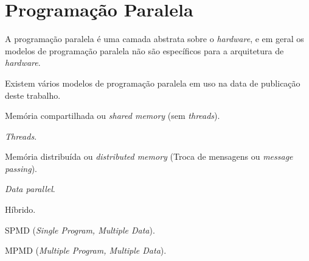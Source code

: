 
\section{Programação Paralela}

A programação paralela é uma camada abstrata sobre o \textit{hardware}, e em 
geral os modelos de programação paralela não são específicos para a arquitetura
de \textit{hardware}.

Existem vários modelos de programação paralela em uso na data de publicação
deste trabalho.

\begin{alineas}
        \item Memória compartilhada ou \textit{shared memory} (sem
                        \textit{threads}).
        \item \textit{Threads}.
        \item Memória distribuída ou \textit{distributed memory} (Troca de
                        mensagens ou \textit{message passing}).
        \item \textit{Data parallel}.
        \item Híbrido.
        \item SPMD (\textit{Single Program, Multiple Data}).
        \item MPMD (\textit{Multiple Program, Multiple Data}).
\end{alineas}




